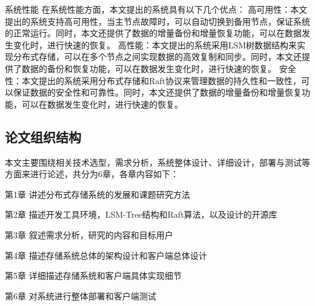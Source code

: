 系统性能
在系统性能方面，本文提出的系统具有以下几个优点：
高可用性：本文提出的系统支持高可用性，当主节点故障时，可以自动切换到备用节点，保证系统的正常运行。同时，本文还提供了数据的增量备份和增量恢复功能，可以在数据发生变化时，进行快速的恢复。
高性能：本文提出的系统采用LSM树数据结构来实现分布式存储，可以在多个节点之间实现数据的高效复制和同步。同时，本文还提供了数据的备份和恢复功能，可以在数据发生变化时，进行快速的恢复。
安全性：本文提出的系统采用分布式存储和Raft协议来管理数据的持久性和一致性，可以保证数据的安全性和可靠性。同时，本文还提供了数据的增量备份和增量恢复功能，可以在数据发生变化时，进行快速的恢复。
  	\subsection{论文组织结构}
  
  	本文主要围绕相关技术选型，需求分析，系统整体设计、详细设计，部署与测试等方面来进行论述，共分为6章，各章内容如下：
	
	第1章 讲述分布式存储系统的发展和课题研究方法
	
    第2章 描述开发工具环境，LSM-Tree结构和Raft算法，以及设计的开源库
    
    第3章 叙述需求分析，研究的内容和目标用户
    
    第4章 描述存储系统总体的架构设计和客户端总体设计
       
    第5章 详细描述存储系统和客户端具体实现细节
    
    第6章 对系统进行整体部署和客户端测试
    
    
\clearpage